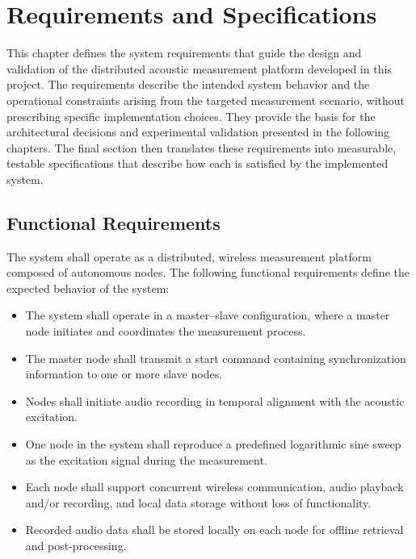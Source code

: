 \chapter{Requirements and Specifications} \label{Requirements}

This chapter defines the system requirements that guide the design and validation of the distributed acoustic measurement platform developed in this project. The requirements describe the intended system behavior and the operational constraints arising from the targeted measurement scenario, without prescribing specific implementation choices. They provide the basis for the architectural decisions and experimental validation presented in the following chapters. The final section then translates these requirements into measurable, testable specifications that describe how each is satisfied by the implemented system.

\section{Functional Requirements}

The system shall operate as a distributed, wireless measurement platform composed of autonomous nodes. The following functional requirements define the expected behavior of the system:

\begin{itemize}
  \item The system shall operate in a master--slave configuration, where a master node initiates and coordinates the measurement process.

  \item The master node shall transmit a start command containing synchronization information to one or more slave nodes.

  \item Nodes shall initiate audio recording in temporal alignment with the acoustic excitation.

  \item One node in the system shall reproduce a predefined logarithmic sine sweep as the excitation signal during the measurement.

  \item Each node shall support concurrent wireless communication, audio playback and/or recording, and local data storage without loss of functionality.

  \item Recorded audio data shall be stored locally on each node for offline retrieval and post-processing.
\end{itemize}

